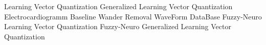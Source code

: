 	{ Learning Vector Quantization }
	{ Generalized Learning Vector Quantization }
	{ Electrocardiogramm }
	{ Baseline Wander Removal }
	{ WaveForm DataBase }
	{ Fuzzy-Neuro Learning Vector Quantization }
	{ Fuzzy-Neuro Generalized Learning Vector
Quantization }
